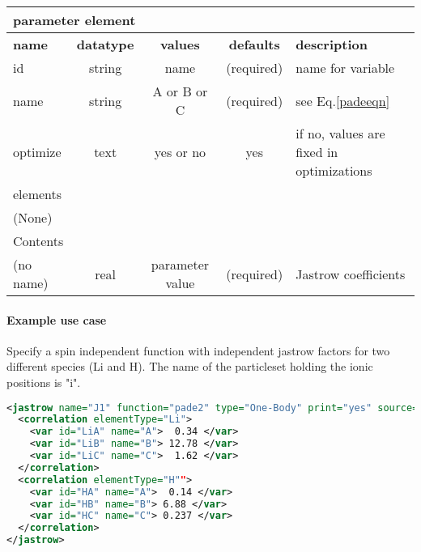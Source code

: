 \begin{table}[h]
\begin{center}
\begin{tabular}{l c c c l }
\hline
\multicolumn{5}{l}{parameter element} \\
\hline
\bfseries name & \bfseries datatype & \bfseries values & \bfseries defaults & \bfseries description \\
\hline
id & string & name & (required) & name for variable \\
name & string & A or B or C & (required) & see Eq.\ref{padeeqn}\\
optimize & text & yes or no & yes & if no, values are fixed in optimizations \\
\hline
\multicolumn{5}{l}{elements}\\ \hline
(None) & & & \\ \hline
\multicolumn{5}{l}{Contents}\\ \hline
 (no name) & real & parameter value & (required) & Jastrow coefficients \\ \hline
\end{tabular}
\end{center}
\end{table}

\paragraph{Example use case}
\label{sec:1bjpadeexamples}

Specify a spin independent function with independent jastrow factors for two different species (Li and H).
The name of the particleset holding the ionic positions is "i".
\begin{lstlisting}[language=xml]
<jastrow name="J1" function="pade2" type="One-Body" print="yes" source="i">
  <correlation elementType="Li">
    <var id="LiA" name="A">  0.34 </var>
    <var id="LiB" name="B"> 12.78 </var>
    <var id="LiC" name="C">  1.62 </var>
  </correlation>
  <correlation elementType="H"">
    <var id="HA" name="A">  0.14 </var>
    <var id="HB" name="B"> 6.88 </var>
    <var id="HC" name="C"> 0.237 </var>
  </correlation>
</jastrow>
\end{lstlisting}

